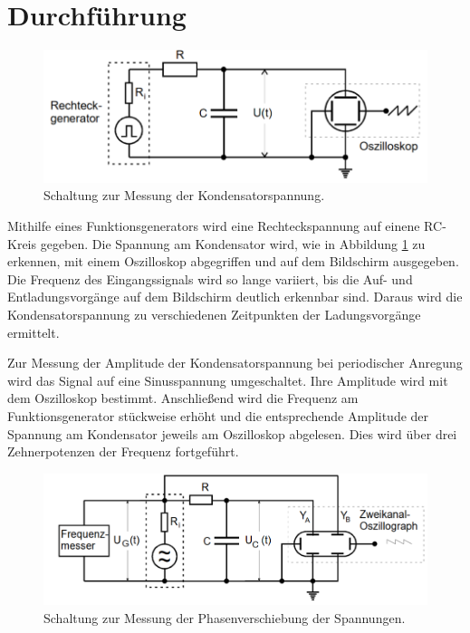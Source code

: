 \section{Durchführung}
\label{sec:Durchführung}

\begin{figure}[H]
  \centering
  \includegraphics[width=14cm]{Schaltung1.PNG}
  \caption{Schaltung zur Messung der Kondensatorspannung. \cite{sample}}
  \label{fig:Schaltung1}
\end{figure}

Mithilfe eines Funktionsgenerators wird eine Rechteckspannung auf einene RC-Kreis
gegeben. Die Spannung am Kondensator wird, wie in Abbildung \ref{fig:Schaltung1}
zu erkennen, mit einem Oszilloskop abgegriffen und
auf dem Bildschirm ausgegeben. Die Frequenz des Eingangssignals wird so lange variiert,
bis die Auf- und Entladungsvorgänge auf dem Bildschirm deutlich erkennbar sind.
Daraus wird die Kondensatorspannung zu verschiedenen Zeitpunkten der Ladungsvorgänge ermittelt.

Zur Messung der Amplitude der Kondensatorspannung bei periodischer Anregung
wird das Signal auf eine Sinusspannung umgeschaltet. Ihre Amplitude wird mit dem Oszilloskop bestimmt.
Anschließend wird die Frequenz am Funktionsgenerator stückweise erhöht und die entsprechende Amplitude
der Spannung am Kondensator jeweils am Oszilloskop abgelesen. Dies wird über drei Zehnerpotenzen der Frequenz
fortgeführt.

\begin{figure}[H]
  \centering
  \includegraphics[width=14cm]{Schaltung2.PNG}
  \caption{Schaltung zur Messung der Phasenverschiebung der Spannungen. \cite{sample}}
  \label{fig:Schaltung2}
\end{figure}

